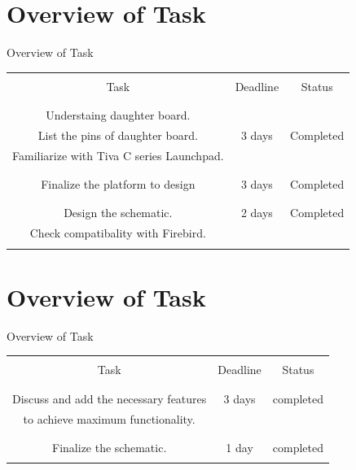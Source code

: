 \documentclass[10pt, a4paper]{beamer}
\begin{document}
\section{Overview of Task}
\begin{frame}{Overview of Task}
	\begin{tabular}{|c|c|c|}
		\hline
		 & & \\
		Task & Deadline & Status\\
		 & & \\
		\hline
		 & & \\
			 {Understaing daughter board.}& &\\
			{List the pins of daughter board.} & 3 days & Completed\\
			{Familiarize with Tiva C series Launchpad.} & &\\
			 & & \\
			\hline
			 & & \\
			Finalize the platform to design & 3 days & Completed\\
			 & & \\
			\hline
			 & & \\
			 Design the schematic. & 2 days & Completed \\
			 Check compatibality with Firebird. & & \\ 
			  & & \\
			\hline			
	\end{tabular}
\end{frame}

\section{Overview of Task}
\begin{frame}{Overview of Task}
\begin{tabular}{|c|c|c|}
	\hline
	& & \\
	Task & Deadline & Status\\
	& & \\
	\hline
	& & \\
	Discuss and add the necessary features & 3 days  & completed  \\ to achieve maximum functionality. & &  \\ 
	 & & \\
	\hline
	 & & \\
	Finalize the schematic. & 1 day & completed \\
	 & & \\
	\hline			
\end{tabular}
\end{frame}
\end{document}
